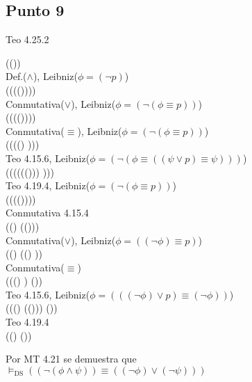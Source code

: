\documentclass{article}
\begin{document}
\subsection{Punto 9}
\begin{logicenv}{Teo 4.25.2}
    \begin{derivation}
        (\neg (\phi \land \psi))\\
    Def.($\land$), Leibniz($\phi = (\neg p)$)\\
        (\neg (\phi \equiv (\psi \equiv (\phi \lor \psi))))\\
    Conmutativa($\lor$), Leibniz($\phi = (\neg (\phi \equiv p))$)\\
        (\neg (\phi \equiv(\psi \equiv (\psi \lor \phi))))\\
    Conmutativa($\equiv$), Leibniz($\phi = (\neg (\phi \equiv p))$)\\
        (\neg (\phi \equiv ((\psi \lor \phi) \equiv \psi)))\\
    Teo 4.15.6, Leibniz($\phi = (\neg (\phi \equiv ((\psi \lor p) \equiv \psi)))$)\\
        (\neg (\phi \equiv ((\psi \lor (\neg (\neg \phi))) \equiv \psi)))\\
    Teo 4.19.4, Leibniz($\phi = (\neg (\phi \equiv p))$)\\
        (\neg (\phi \equiv (\psi \lor (\neg \phi))))\\
    Conmutativa 4.15.4\\
        ((\neg \phi) \equiv (\psi \lor (\neg \phi)))\\
    Conmutativa($\lor$), Leibniz($\phi = ((\neg \phi) \equiv p)$)\\
        ((\neg \phi) \equiv ((\neg \phi) \lor \psi))\\
    Conmutativa($\equiv$)\\
        (((\neg \phi) \lor \psi) \equiv (\neg \phi))\\
    Teo 4.15.6, Leibniz($\phi = (((\neg \phi) \lor p) \equiv (\neg \phi))$)\\
        (((\neg \phi) \lor (\neg(\neg \psi))) \equiv (\neg \phi))\\
    Teo 4.19.4\\
        ((\neg \phi) \lor (\neg \psi))
    \end{derivation}
    Por MT 4.21 se demuestra que\\
    $\vDash_{\text{DS}} ((\neg (\phi \land \psi)) \equiv ((\neg \phi) \lor (\neg \psi)))$
\end{logicenv}
\end{document}
